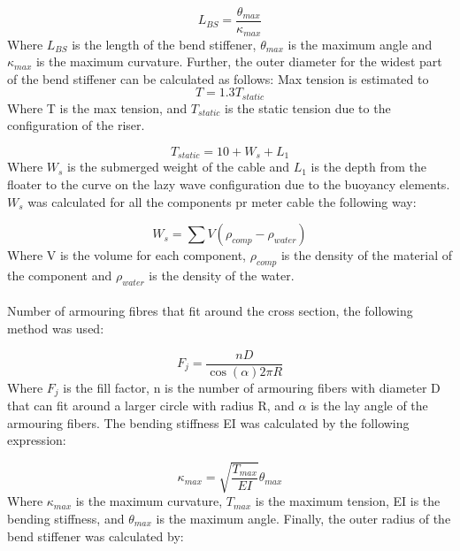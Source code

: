 \begin{equation}
   L_{BS} = \frac{\theta_{max}}{\kappa_{max}} 
  \end{equation}
Where $L_{BS}$ is the length of the bend stiffener, $\theta_{max}$ is the maximum angle and $\kappa_{max}$ is the maximum curvature. \newline
\newline
Further, the outer diameter for the widest part of the bend stiffener can be calculated as follows: \newline
\newline 
Max tension is estimated to 
\begin{equation}
   T = 1.3  T_{static}
\end{equation}
Where T is the max tension, and $T_{static}$ is the static tension due to the configuration of the riser.

\begin{equation}
   T_{static} = 10 + W_s + L_1
\end{equation}
Where $W_s$ is the submerged weight of the cable and $L_1$ is the depth from the floater to the curve on the lazy wave configuration due to the buoyancy elements.\newline
\newline
\noindent $W_s$ was calculated for all the components pr meter cable the following way:

\begin{equation}
   W_s = \sum V (\rho_{comp}-\rho_{water})
\end{equation}
 Where V is the volume for each component, $\rho_{comp}$ is the density of the material of the component and $\rho_{water}$ is the density of the water.\\\\ Number of armouring fibres that fit around the cross section, the following method was used: 

 \begin{equation}
   F_j=\frac{n D}{\cos{(\alpha)} 2 \pi R}
\end{equation}
Where $F_j$ is the fill factor, n is the number of armouring fibers with diameter D  that can fit around a larger circle with radius R, and $\alpha$ is the lay angle of the armouring fibers.  \newline
\newline 
The bending stiffness EI was calculated by the following expression:

 \begin{equation}
   \kappa_{max} = \sqrt{\frac{T_{max}}{EI}}\theta_{max}
\end{equation}
Where $\kappa_{max}$ is the maximum curvature, $T_{max}$ is the maximum tension, EI is the bending stiffness, and $\theta_{max}$ is the maximum angle.\newline  
\newline 
\noindent Finally, the outer radius of the bend stiffener was calculated by:

